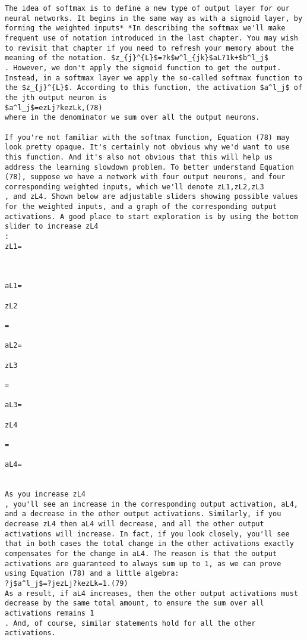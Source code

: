 \begin{lstlisting}
The idea of softmax is to define a new type of output layer for our neural networks. It begins in the same way as with a sigmoid layer, by forming the weighted inputs* *In describing the softmax we'll make frequent use of notation introduced in the last chapter. You may wish to revisit that chapter if you need to refresh your memory about the meaning of the notation. $z_{j}^{L}$=?k$w^l_{jk}$aL?1k+$b^l_j$
. However, we don't apply the sigmoid function to get the output. Instead, in a softmax layer we apply the so-called softmax function to the $z_{j}^{L}$. According to this function, the activation $a^l_j$ of the jth output neuron is 
$a^l_j$=ezLj?kezLk,(78)
where in the denominator we sum over all the output neurons.

If you're not familiar with the softmax function, Equation (78) may look pretty opaque. It's certainly not obvious why we'd want to use this function. And it's also not obvious that this will help us address the learning slowdown problem. To better understand Equation (78), suppose we have a network with four output neurons, and four corresponding weighted inputs, which we'll denote zL1,zL2,zL3
, and zL4. Shown below are adjustable sliders showing possible values for the weighted inputs, and a graph of the corresponding output activations. A good place to start exploration is by using the bottom slider to increase zL4
:
zL1=



aL1=

zL2

= 

aL2=

zL3

= 

aL3=

zL4

= 

aL4=


As you increase zL4
, you'll see an increase in the corresponding output activation, aL4, and a decrease in the other output activations. Similarly, if you decrease zL4 then aL4 will decrease, and all the other output activations will increase. In fact, if you look closely, you'll see that in both cases the total change in the other activations exactly compensates for the change in aL4. The reason is that the output activations are guaranteed to always sum up to 1, as we can prove using Equation (78) and a little algebra: 
?j$a^l_j$=?jezLj?kezLk=1.(79)
As a result, if aL4 increases, then the other output activations must decrease by the same total amount, to ensure the sum over all activations remains 1
. And, of course, similar statements hold for all the other activations.


\end{lstlisting}

